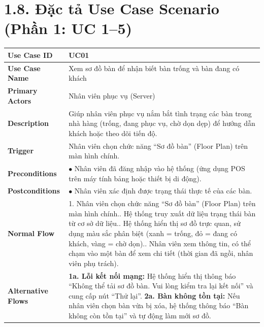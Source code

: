 \documentclass[12pt,a4paper]{article}
\begin{document}
\section*{1.8. Đặc tả Use Case Scenario (Phần 1: UC 1--5)}

\begin{longtable}{|L{3.5cm}|L{12.5cm}|}
\hline
\textbf{Use Case ID} & UC01 \\ \hline
\textbf{Use Case Name} & Xem sơ đồ bàn để nhận biết bàn trống và bàn đang có khách \\ \hline
\textbf{Primary Actors} & Nhân viên phục vụ (Server) \\ \hline
\textbf{Description} & Giúp nhân viên phục vụ nắm bắt tình trạng các bàn trong nhà hàng (trống, đang phục vụ, chờ dọn dẹp) để hướng dẫn khách hoặc theo dõi tiến độ. \\ \hline
\textbf{Trigger} & Nhân viên chọn chức năng ``Sơ đồ bàn'' (Floor Plan) trên màn hình chính. \\ \hline
\textbf{Preconditions} & $\bullet$ Nhân viên đã đăng nhập vào hệ thống (ứng dụng POS trên máy tính bảng hoặc thiết bị di động). \\ \hline
\textbf{Postconditions} & $\bullet$ Nhân viên xác định được trạng thái thực tế của các bàn. \\ \hline
\textbf{Normal Flow} &
1. Nhân viên chọn chức năng ``Sơ đồ bàn'' (Floor Plan) trên màn hình chính.. Hệ thống truy xuất dữ liệu trạng thái bàn từ cơ sở dữ liệu.. Hệ thống hiển thị sơ đồ trực quan, sử dụng màu sắc phân biệt (xanh = trống, đỏ = đang có khách, vàng = chờ dọn).. Nhân viên xem thông tin, có thể chạm vào một bàn để xem chi tiết (thời gian đã ngồi, nhân viên phụ trách). \\ \hline
\textbf{Alternative Flows} &
\textbf{1a. Lỗi kết nối mạng:} Hệ thống hiển thị thông báo ``Không thể tải sơ đồ bàn. Vui lòng kiểm tra lại kết nối'' và cung cấp nút ``Thử lại''.\newline
\textbf{2a. Bàn không tồn tại:} Nếu nhân viên chọn bàn vừa bị xóa, hệ thống thông báo ``Bàn không còn tồn tại'' và tự động làm mới sơ đồ. \\ \hline
\end{longtable}
\end{document}
